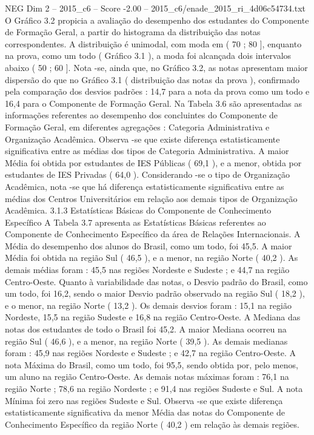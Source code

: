 \begin{textsample}{NEG Dim 2 – 2015\_c6 – Score -2.00 – 2015\_c6/enade\_2015\_ri\_4d06c54734.txt}
O Gráfico 3.2 propicia a avaliação do desempenho dos estudantes do Componente de Formação Geral, a partir do histograma da distribuição das notas correspondentes.
A distribuição é unimodal, com moda em ( 70 ; 80 ], enquanto na prova, como um todo ( Gráfico 3.1 ), a moda foi alcançada dois intervalos abaixo ( 50 ; 60 ].
Nota -se, ainda que, no Gráfico 3.2, as notas apresentam maior dispersão do que no Gráfico 3.1 ( distribuição das notas da prova ), confirmado pela comparação dos desvios padrões : 14,7 para a nota da prova como um todo e 16,4 para o Componente de Formação Geral.
Na Tabela 3.6 são apresentadas as informações referentes ao desempenho dos concluintes do Componente de Formação Geral, em diferentes agregações : Categoria Administrativa e Organização Acadêmica.
Observa -se que existe diferença estatisticamente significativa entre as médias dos tipos de Categoria Administrativa.
A maior Média foi obtida por estudantes de IES Públicas ( 69,1 ), e a menor, obtida por estudantes de IES Privadas ( 64,0 ).
Considerando -se o tipo de Organização Acadêmica, nota -se que há diferença estatisticamente significativa entre as médias dos Centros Universitários em relação aos demais tipos de Organização Acadêmica. 3.1.3 Estatísticas Básicas do Componente de Conhecimento Específico A Tabela 3.7 apresenta as Estatísticas Básicas referentes ao Componente de Conhecimento Específico da área de Relações Internacionais.
A Média do desempenho dos alunos do Brasil, como um todo, foi 45,5.
A maior Média foi obtida na região Sul ( 46,5 ), e a menor, na região Norte ( 40,2 ).
As demais médias foram : 45,5 nas regiões Nordeste e Sudeste ; e 44,7 na região Centro-Oeste.
Quanto à variabilidade das notas, o Desvio padrão do Brasil, como um todo, foi 16,2, sendo o maior Desvio padrão observado na região Sul ( 18,2 ), e o menor, na região Norte ( 13,2 ).
Os demais desvios foram : 15,1 na região Nordeste, 15,5 na região Sudeste e 16,8 na região Centro-Oeste.
A Mediana das notas dos estudantes de todo o Brasil foi 45,2.
A maior Mediana ocorreu na região Sul ( 46,6 ), e a menor, na região Norte ( 39,5 ).
As demais medianas foram : 45,9 nas regiões Nordeste e Sudeste ; e 42,7 na região Centro-Oeste.
A nota Máxima do Brasil, como um todo, foi 95,5, sendo obtida por, pelo menos, um aluno na região Centro-Oeste.
As demais notas máximas foram : 76,1 na região Norte ; 78,6 na região Nordeste ; e 91,4 nas regiões Sudeste e Sul.
A nota Mínima foi zero nas regiões Sudeste e Sul.
Observa -se que existe diferença estatisticamente significativa da menor Média das notas do Componente de Conhecimento Específico da região Norte ( 40,2 ) em relação às demais regiões.

\end{textsample}
